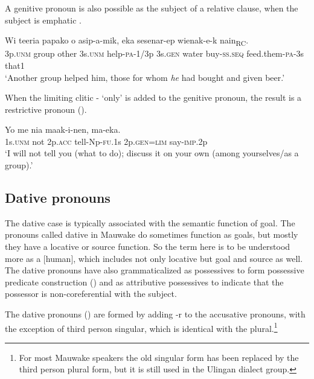 A genitive pronoun is also possible as the subject of a relative clause, when the subject is emphatic .

\ea%
\label{ex:3:x1809}
\gll Wi teeria papako o asip-a-mik, {\ob} eka sesenar-ep wienak-e-k nain{\cb}\textsubscript{RC}.
\\
3p.\textsc{unm} group other 3s.\textsc{unm} help-\textsc{pa}-1/3p 3s.\textsc{gen} water buy-\textsc{ss}.\textsc{seq} feed.them-\textsc{pa}-3s that1\\
\glt`Another group helped him, those for whom \textit{he} had bought and given beer.'
\z

When the limiting clitic - `only' is added to the genitive pronoun, the result is a restrictive pronoun  ().

\ea%
\label{ex:3:x604}
\gll Yo me nia maak-i-nen,  ma-eka. \\
1s.\textsc{unm} not 2p.\textsc{acc} tell-Np-\textsc{fu}.1s 2p.\textsc{gen}=\textsc{lim} say-\textsc{imp}.2p\\
\glt`I will not tell you (what to do); discuss it on your own (among yourselves/as a group).'
\z

\subsection{Dative pronouns}\label{sec:3.5.5}
{}
The dative case is typically associated with the semantic function of goal. The pronouns called dative in Mauwake do sometimes function as goals, but mostly they have a locative or source function. So the term here is to be understood more as a [\textstyleEmphasizedWords{{+}}human]\textstyleEmphasizedWords{ }, which includes not only locative but goal and source as well. The dative pronouns have also grammaticalized as possessives to form possessive predicate construction () and as attributive possessives to indicate that the possessor is non-coreferential with the subject. 

The dative pronouns () are formed by adding -r to the accusative pronouns, with the exception of third person singular, which is identical with the plural.\footnote{For most Mauwake speakers the old singular form  has been replaced by the third person plural form, but it is still used in the Ulingan dialect group.}

